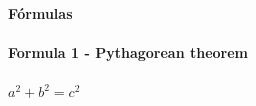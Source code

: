 \documentclass[idxtotoc,hyperref,openany]{labbook} %
\begin{document}

\newpage

\huge \textbf{Fórmulas} \\ \\

\normalsize \textbf{Formula 1 - Pythagorean theorem}\\ \\
$a^2 + b^2 = c^2$\\ \\




\end{document}
